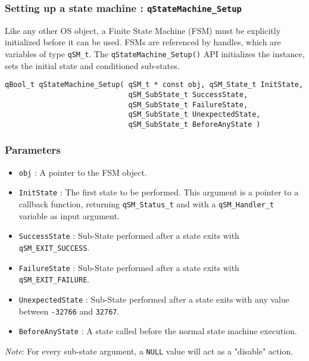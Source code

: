 \subsubsection{Setting up a state machine : \texorpdfstring{\lstinline{qStateMachine_Setup}}{qStateMachine_Setup} }
Like any other OS object, a Finite State Machine (FSM) must be explicitly initialized before it can be used. FSMs are referenced by handles, which are variables of type \lstinline{qSM_t}. 
The \lstinline{qStateMachine_Setup()} API   initializes the instance, sets the initial state and conditioned sub-states.
\medskip

\begin{lstlisting}[style=CStyle]
qBool_t qStateMachine_Setup( qSM_t * const obj, qSM_State_t InitState,
                             qSM_SubState_t SuccessState, 
                             qSM_SubState_t FailureState, 
                             qSM_SubState_t UnexpectedState, 
                             qSM_SubState_t BeforeAnyState )
\end{lstlisting}

\subsubsection*{Parameters}
\begin{itemize}
    \item \lstinline{obj} : A pointer to the FSM object.
    \item \lstinline{InitState} :  The first state to be performed. This argument is a pointer to a callback function, returning \lstinline{qSM_Status_t} and with a \lstinline{qSM_Handler_t} variable as input argument.
    \item \lstinline{SuccessState} :  Sub-State performed after a state exits with  \lstinline{qSM_EXIT_SUCCESS}. 
    \item \lstinline{FailureState} :  Sub-State performed after a state exits with  \lstinline{qSM_EXIT_FAILURE}. 
    \item \lstinline{UnexpectedState} :  Sub-State performed after a state exits with any value between \lstinline{-32766} and \lstinline{32767}. 
    \item \lstinline{BeforeAnyState} :  A state called before the normal state machine execution.
\end{itemize}  

\begin{tcolorbox}
\ArrowBoldDownRight \textit{Note}: For every sub-state argument, a \lstinline{NULL} value will act as a "disable" action.
\end{tcolorbox}

